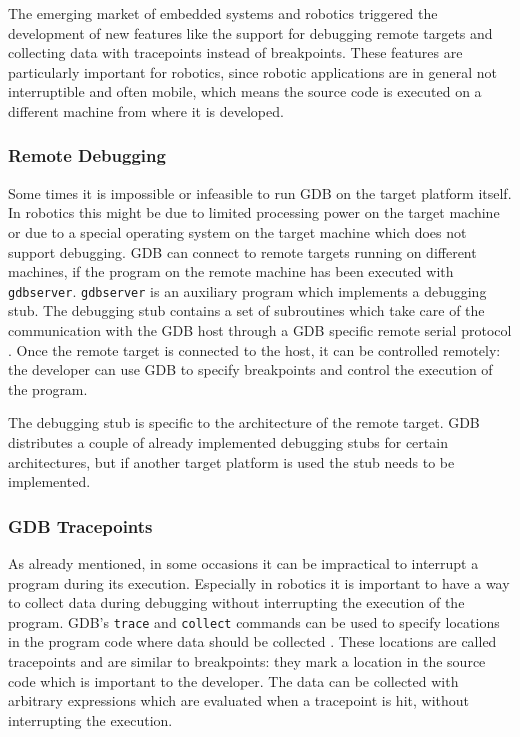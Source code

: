 The emerging market of embedded systems and robotics triggered the development of new features like the support for debugging remote targets and collecting data with tracepoints instead of breakpoints. These features are particularly important for robotics, since robotic applications are in general not interruptible and often mobile, which means the source code is executed on a different machine from where it is developed.

\subsubsection{Remote Debugging}
Some times it is impossible or infeasible to run GDB on the target platform itself. In robotics this might be due to limited processing power on the target machine or due to a special operating system on the target machine which does not support debugging. GDB can connect to remote targets running on different machines, if the program on the remote machine has been executed with \verb+gdbserver+. \verb+gdbserver+ is an auxiliary program which implements a debugging stub. The debugging stub contains a set of subroutines which take care of the communication with the GDB host through a GDB specific remote serial protocol \cite{Stallman2002}. Once the remote target is connected to the host, it can be controlled remotely: the developer can use GDB to specify breakpoints and control the execution of the program.

The debugging stub is specific to the architecture of the remote target. GDB distributes a couple of already implemented debugging stubs for certain architectures, but if another target platform is used the stub needs to be implemented.

\subsubsection{GDB Tracepoints}
As already mentioned, in some occasions it can be impractical to interrupt a program during its execution. Especially in robotics it is important to have a way to collect data during debugging without interrupting the execution of the program. GDB's \verb+trace+ and \verb+collect+ commands can be used to specify locations in the program code where data should be collected \cite{Stallman2002}. These locations are called tracepoints and are similar to breakpoints: they mark a location in the source code which is important to the developer. The data can be collected with arbitrary expressions which are evaluated when a tracepoint is hit, without interrupting the execution.

